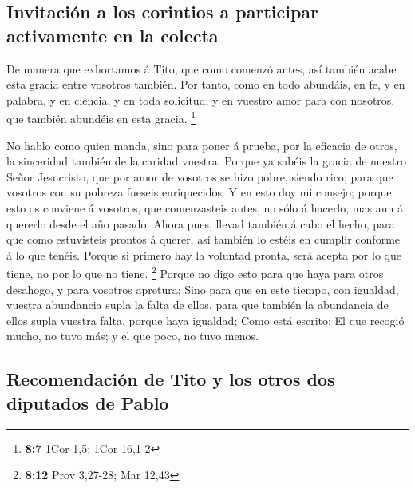 \hypertarget{invitaciuxf3n-a-los-corintios-a-participar-activamente-en-la-colecta}{%
\subsection{Invitación a los corintios a participar activamente en la
colecta}\label{invitaciuxf3n-a-los-corintios-a-participar-activamente-en-la-colecta}}

 De manera que exhortamos á Tito, que como comenzó antes,
así también acabe esta gracia entre vosotros también.  Por
tanto, como en todo abundáis, en fe, y en palabra, y en ciencia, y en
toda solicitud, y en vuestro amor para con nosotros, que también
abundéis en esta gracia. \footnote{\textbf{8:7} 1Cor 1,5; 1Cor 16,1-2}

 No hablo como quien manda, sino para poner á prueba, por la
eficacia de otros, la sinceridad también de la caridad vuestra.
 Porque ya sabéis la gracia de nuestro Señor Jesucristo, que
por amor de vosotros se hizo pobre, siendo rico; para que vosotros con
su pobreza fueseis enriquecidos.  Y en esto doy mi consejo;
porque esto os conviene á vosotros, que comenzasteis antes, no sólo á
hacerlo, mas aun á quererlo desde el año pasado.  Ahora
pues, llevad también á cabo el hecho, para que como estuvisteis prontos
á querer, así también lo estéis en cumplir conforme á lo que tenéis.
 Porque si primero hay la voluntad pronta, será acepta por
lo que tiene, no por lo que no tiene. \footnote{\textbf{8:12} Prov
  3,27-28; Mar 12,43}  Porque no digo esto para que haya
para otros desahogo, y para vosotros apretura;  Sino para
que en este tiempo, con igualdad, vuestra abundancia supla la falta de
ellos, para que también la abundancia de ellos supla vuestra falta,
porque haya igualdad;  Como está escrito: El que recogió
mucho, no tuvo más; y el que poco, no tuvo menos.

\hypertarget{recomendaciuxf3n-de-tito-y-los-otros-dos-diputados-de-pablo}{%
\subsection{Recomendación de Tito y los otros dos diputados de
Pablo}\label{recomendaciuxf3n-de-tito-y-los-otros-dos-diputados-de-pablo}}

